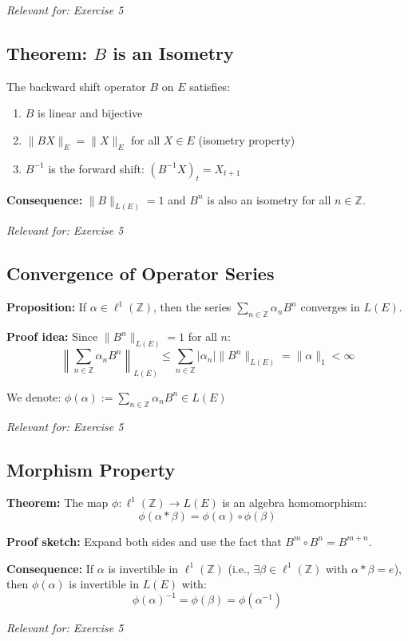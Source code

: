 \documentclass[a4paper, 12pt]{article}
\begin{document}
\textit{Relevant for: Exercise 5}

\subsection{Theorem: $B$ is an Isometry}
The backward shift operator $B$ on $E$ satisfies:
\begin{enumerate}
\item $B$ is linear and bijective
\item $\|BX\|_E = \|X\|_E$ for all $X \in E$ (isometry property)
\item $B^{-1}$ is the forward shift: $(B^{-1}X)_t = X_{t+1}$
\end{enumerate}

\textbf{Consequence:} $\|B\|_{L(E)} = 1$ and $B^n$ is also an isometry for all $n \in \mathbb{Z}$.

\textit{Relevant for: Exercise 5}

\subsection{Convergence of Operator Series}
\textbf{Proposition:} If $\alpha \in \ell^1(\mathbb{Z})$, then the series $\sum_{n \in \mathbb{Z}} \alpha_n B^n$ converges in $L(E)$.

\textbf{Proof idea:} Since $\|B^n\|_{L(E)} = 1$ for all $n$:
\[
\left\|\sum_{n \in \mathbb{Z}} \alpha_n B^n\right\|_{L(E)} \leq \sum_{n \in \mathbb{Z}} |\alpha_n| \|B^n\|_{L(E)} = \|\alpha\|_1 < \infty
\]

We denote: $\phi(\alpha) := \sum_{n \in \mathbb{Z}} \alpha_n B^n \in L(E)$

\textit{Relevant for: Exercise 5}

\subsection{Morphism Property}
\textbf{Theorem:} The map $\phi: \ell^1(\mathbb{Z}) \to L(E)$ is an algebra homomorphism:
\[
\phi(\alpha * \beta) = \phi(\alpha) \circ \phi(\beta)
\]

\textbf{Proof sketch:} Expand both sides and use the fact that $B^m \circ B^n = B^{m+n}$.

\textbf{Consequence:} If $\alpha$ is invertible in $\ell^1(\mathbb{Z})$ (i.e., $\exists \beta \in \ell^1(\mathbb{Z})$ with $\alpha*\beta = e$), then $\phi(\alpha)$ is invertible in $L(E)$ with:
\[
\phi(\alpha)^{-1} = \phi(\beta) = \phi(\alpha^{-1})
\]

\textit{Relevant for: Exercise 5}
\end{document}
